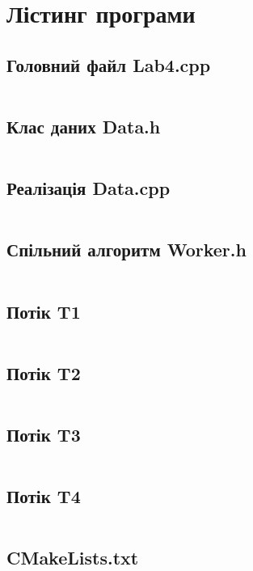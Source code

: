 \documentclass[12pt,a4paper]{article}
\begin{document}
\appendix
\section{Лістинг програми}
\subsection{Головний файл Lab4.cpp}
\inputminted{cpp}{../src/Lab4.cpp}
\subsection{Клас даних Data.h}
\inputminted{cpp}{../src/Data.h}
\subsection{Реалізація Data.cpp}
\inputminted{cpp}{../src/Data.cpp}
\subsection{Спільний алгоритм Worker.h}
\inputminted{cpp}{../src/Worker.h}
\subsection{Потік T1}
\inputminted{cpp}{../src/T1.h}
\subsection{Потік T2}
\inputminted{cpp}{../src/T2.h}
\subsection{Потік T3}
\inputminted{cpp}{../src/T3.h}
\subsection{Потік T4}
\inputminted{cpp}{../src/T4.h}
\subsection{CMakeLists.txt}
\inputminted{cmake}{../src/CMakeLists.txt}
\end{document}
